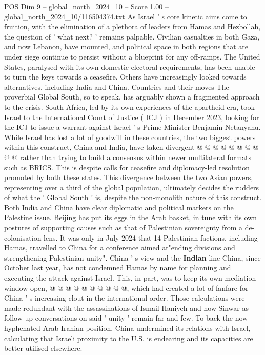 \begin{textsample}{POS Dim 9 – global\_north\_2024\_10 – Score 1.00 – global\_north\_2024\_10/116504374.txt}  \label{ex:f9_pos_404}
As Israel ' s core kinetic aims come to fruition, with the elimination of a plethora of leaders from Hamas and Hezbollah, the question of ' what next? ' remains palpable.
Civilian casualties in both Gaza, and now Lebanon, have mounted, and political space in both regions that are under siege continue to persist without a blueprint for any off-ramps.
The United States, paralysed with its own domestic electoral requirements, has been unable to turn the keys towards a ceasefire.
Others have increasingly looked towards alternatives, including India and China.
Countries and their moves The proverbial Global South, so to speak, has arguably shown a fragmented approach to the crisis.
South Africa, led by its own experiences of the apartheid era, took Israel to the International Court of Justice ( ICJ ) in December 2023, looking for the ICJ to issue a warrant against Israel ' s Prime Minister Benjamin Netanyahu.
While Israel has lost a lot of goodwill in these countries, the two biggest powers within this construct, China and India, have taken divergent @ @ @ @ @ @ @ @ @ @ rather than trying to build a consensus within newer multilateral formats such as BRICS.
This is despite calls for ceasefire and diplomacy-led resolution promoted by both these states.
This divergence between the two Asian powers, representing over a third of the global population, ultimately decides the rudders of what the ' Global South ' is, despite the non-monolith nature of this construct.
Both India and China have clear diplomatic and political markers on the Palestine issue.
Beijing has put its eggs in the Arab basket, in tune with its own postures of supporting causes such as that of Palestinian sovereignty from a de-colonisation lens.
It was only in July 2024 that 14 Palestinian factions, including Hamas, travelled to China for a conference aimed at"ending divisions and strengthening Palestinian unity".
China ' s view and the \textbf{Indian} line China, since October last year, has not condemned Hamas by name for planning and executing the attack against Israel.
This, in part, was to keep its own mediation window open, @ @ @ @ @ @ @ @ @ @, which had created a lot of fanfare for China ' s increasing clout in the international order.
Those calculations were made redundant with the assassinations of Ismail Haniyeh and now Sinwar as follow-up conversations on said ' unity ' remain far and few.
To back the now hyphenated Arab-Iranian position, China undermined its relations with Israel, calculating that Israeli proximity to the U.S. is endearing and its capacities are better utilised elsewhere.

\end{textsample}
